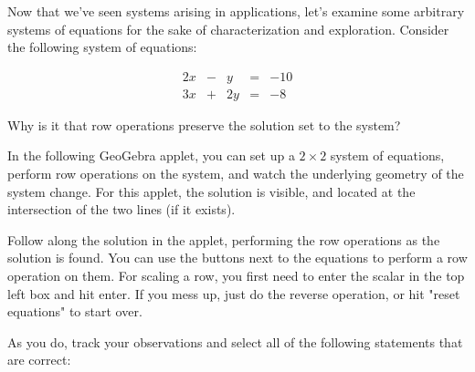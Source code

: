 \documentclass{ximera}
\begin{document}
  \begin{example}

    Now that we've seen systems arising in applications, let's examine some arbitrary systems of equations for the sake of characterization and exploration. Consider the following system of equations:
 
    $$\begin{matrix}
      2x& -&y&=&-10\\
      3x & +&2y&= &-8
    \end{matrix}$$

    Why is it that row operations preserve the solution set to the system?

    In the following GeoGebra applet, you can set up a $2\times 2$ system of equations, perform row operations on the system, and watch the underlying geometry of the system change. For this applet, the solution is visible, and located at the intersection of the two lines (if it exists).

    \begin{center}
    \end{center}

    Follow along the solution in the applet, performing the row operations as the solution is found. You can use the buttons next to the equations to perform a row operation on them. For scaling a row, you first need to enter the scalar in the top left box and hit enter. If you mess up, just do the reverse operation, or hit "reset equations" to start over.
    
    As you do, track your observations and select all of the following statements that are correct:

    \begin{selectAll}
  \end{selectAll}
     

\end{example}
\end{document}
